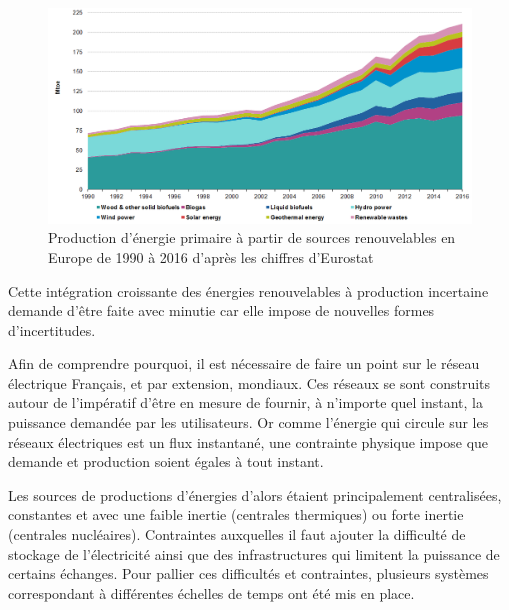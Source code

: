 \documentclass[12pt, french]{report}
\begin{document}
\begin{figure}[htbp]
	\begin{center}
		\includegraphics[width = \linewidth]{Images/Intro/Primary_production_of_energy_1990-2016.png}
		\caption{Production d'énergie primaire à partir de sources renouvelables en Europe de 1990 à 2016 d'après les chiffres d'Eurostat}
		\label{fig:Intro_EnergyProduction}
	\end{center}
\end{figure}

Cette intégration croissante des énergies renouvelables à production incertaine demande d'être faite avec minutie car elle impose de nouvelles formes d'incertitudes. %

Afin de comprendre pourquoi, il est nécessaire de faire un point sur le réseau électrique Français, et par extension, mondiaux. Ces réseaux se sont construits autour de l'impératif d'être en mesure de fournir, à n'importe quel instant, la puissance demandée par les utilisateurs. Or comme l'énergie qui circule sur les réseaux électriques est un flux instantané, une contrainte physique impose que demande et production soient égales à tout instant.

Les sources de productions d'énergies d'alors étaient principalement centralisées, constantes et avec une faible inertie (centrales thermiques) ou forte inertie (centrales nucléaires).  Contraintes auxquelles il faut ajouter la difficulté de stockage de l'électricité ainsi que des infrastructures qui limitent la puissance de certains échanges. Pour pallier ces difficultés et contraintes, plusieurs systèmes correspondant à différentes échelles de temps ont été mis en place.
\end{document}
